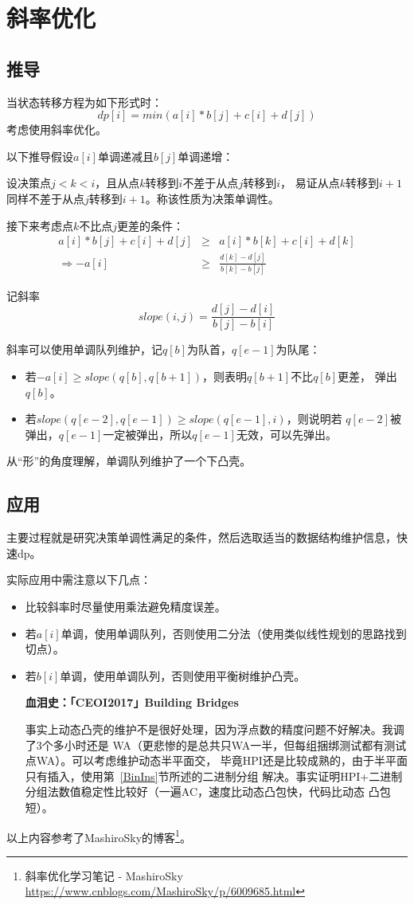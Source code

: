 \section{斜率优化}
\subsection{推导}
当状态转移方程为如下形式时：
\begin{displaymath}
    dp[i]=min(a[i]*b[j]+c[i]+d[j])
\end{displaymath}
考虑使用斜率优化。

以下推导假设$a[i]$单调递减且$b[j]$单调递增：

设决策点$j<k<i$，且从点$k$转移到$i$不差于从点$j$转移到$i$，
易证从点$k$转移到$i+1$同样不差于从点$j$转移到$i+1$。称该性质为决策单调性。

接下来考虑点$k$不比点$j$更差的条件：
\begin{eqnarray*}
    a[i]*b[j]+c[i]+d[j]&\geq&a[i]*b[k]+c[i]+d[k]\\
    \Rightarrow -a[i]&\geq&\frac{d[k]-d[j]}{b[k]-b[j]}
\end{eqnarray*}

记斜率
\begin{displaymath}
    slope(i,j)=\frac{d[j]-d[i]}{b[j]-b[i]}
\end{displaymath}

斜率可以使用单调队列维护，记$q[b]$为队首，$q[e-1]$为队尾：
\begin{itemize}
    \item 若$-a[i]\geq slope(q[b],q[b+1])$，则表明$q[b+1]$不比$q[b]$更差，
    弹出$q[b]$。
    \item 若$slope(q[e-2],q[e-1])\geq slope(q[e-1],i)$，则说明若
    $q[e-2]$被弹出，$q[e-1]$一定被弹出，所以$q[e-1]$无效，可以先弹出。
\end{itemize}

从``形''的角度理解，单调队列维护了一个下凸壳。
\subsection{应用}
主要过程就是研究决策单调性满足的条件，然后选取适当的数据结构维护信息，快速dp。

实际应用中需注意以下几点：
\begin{itemize}
    \item 比较斜率时尽量使用乘法避免精度误差。
    \item 若$a[i]$单调，使用单调队列，否则使用二分法（使用类似线性规划的思路找到切点）。
    \item 若$b[i]$单调，使用单调队列，否则使用平衡树维护凸壳。

    {\bfseries 血泪史：「CEOI2017」Building Bridges

    事实上动态凸壳的维护不是很好处理，因为浮点数的精度问题不好解决。我调了3个多小时还是
    WA（更悲惨的是总共只WA一半，但每组捆绑测试都有测试点WA）。可以考虑维护动态半平面交，
    毕竟HPI还是比较成熟的，由于半平面只有插入，使用第~\ref{BinIns}节所述的二进制分组
    解决。事实证明HPI+二进制分组法数值稳定性比较好（一遍AC，速度比动态凸包快，代码比动态
    凸包短）。
    }
\end{itemize}

以上内容参考了MashiroSky的博客\footnote{斜率优化学习笔记 - MashiroSky
    \url{https://www.cnblogs.com/MashiroSky/p/6009685.html}
}。
